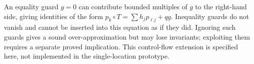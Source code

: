 An equality guard $g=0$ can contribute bounded multiples of $g$ to the
right-hand side, giving identities of the form
$p_k\circ T=\sum h_jp_{\ell j}+qg$. Inequality guards do not vanish and cannot
be inserted into this equation as if they did. Ignoring such guards gives a
sound over-approximation but may lose invariants; exploiting them requires a
separate proved implication. This control-flow extension is specified here,
not implemented in the single-location prototype.

